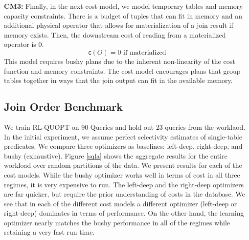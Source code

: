 \vspace{0.25em} \noindent \textbf{CM3: } Finally, in the next cost model, we model temporary tables and memory capacity constraints. There is a budget of tuples that can fit in memory and an additional physical operator that allows for materialization of a join result if memory exists. Then, the downstream cost of reading from a materialized operator is 0.   
\[
\textsf{c}(O) = 0 \text{ if materialized}
\]
This model requires bushy plans due to the inherent non-linearity of the cost function and memory constraints. 
The cost model encourages plans that group tables together in ways that the join output can fit in the available memory.

\subsection*{Join Order Benchmark}
We train RL-QUOPT on 90 Queries and hold out 23 queries from the worklaod. In the initial experiment, we assume perfect selectivity estimates of single-table predicates. We compare three optimizers as baselines: left-deep, right-deep, and bushy (exhaustive). 
Figure \ref{sqla} shows the aggregate results for the entire workload over random partitions of the data. We present results for each of the cost models. 
While the bushy optimizer works well in terms of cost in all three regimes, it is very expensive to run.
The left-deep and the right-deep optimizers are far quicker, but require the prior understanding of costs in the database.
We see that in each of the different cost models a different optimizer (left-deep or right-deep) dominates in terms of performance. 
On the other hand, the learning optimizer nearly matches the bushy performance in all of the regimes while retaining a very fast run time.



